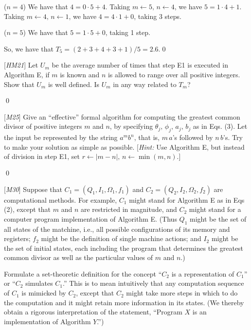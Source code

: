 ($n = 4$) We have that $4 = 0\cdot 5 + 4$. Taking $m \leftarrow 5, \, n \leftarrow 4$, we have $5 = 1\cdot 4 + 1$. Taking $m \leftarrow 4, \, n \leftarrow 1$, we have $4 = 4\cdot 1 + 0$, taking 3 steps.

($n=5$) We have that $5 = 1\cdot 5 + 0$, taking 1 step.

So, we have that $T_5 = (2 + 3 + 4 + 3 + 1) / 5 = 2.6$.\qed



 [\textit{HM21}] Let $U_m$ be the average number of times that step E1 is executed in Algorithm E, if $m$ is known and $n$ is allowed to range over all positive integers. Show that $U_m$ is well defined. Is $U_m$ in any way related to $T_m$?

\sol \qed

 [\textit{M25}] Give an ``effective'' formal algorithm for computing the greatest common divisor of positive integers $m$ and $n$, by specifying $\theta_j, \, \phi_j, \, a_j, \, b_j$ as in Eqs. (3). Let the input be represented by the string $a^mb^n$, that is, $m \, a$'s followed by $n \, b$'s. Try to make your solution as simple as possible. [\textit{Hint:} Use Algorithm E, but instead of division in step E1, set $r \leftarrow |m - n|, \, n \leftarrow \min(m, n)$.]

\sol \qed

 [\textit{M30}] Suppose that $C_1 = (Q_1, I_1, \Omega_1, f_1)$ and $C_2 = (Q_2, I_2, \Omega_2, f_2)$ are computational methods. For example, $C_1$ might stand for Algorithm E as in Eqs (2), except that $m$ and $n$ are restricted in magnitude, and $C_2$ might stand for a computer program implementation of Algorithm E. (Thus $Q_1$ might be the set of all states of the matchine, i.e., all possible configurations of its memory and registers; $f_2$ might be the definition of single machine actions; and $I_2$ might be the set of initial states, each including the program that determines the greatest common divisor as well as the particular values of $m$ and $n$.)

Formulate a set-theoretic definition for the concept ``$C_2$ is a representation of $C_1$'' or ``$C_2$ simulates $C_1$.'' This is to mean intuitively that any computation sequence of $C_1$ is mimicked by $C_2$, except that $C_2$ might take more steps in which to do the computation and it might retain more information in its states. (We thereby obtain a rigorous interpretation of the statement, ``Program $X$ is an implementation of Algorithm $Y$.'')

